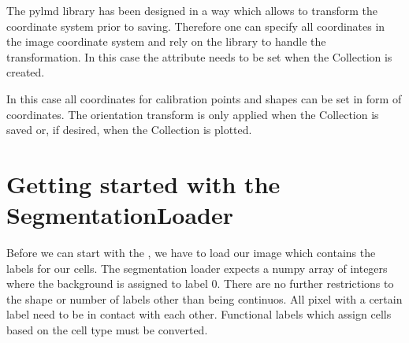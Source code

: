 \documentclass[a4paper,10pt,english,openany,oneside]{sphinxmanual}
\begin{document}
\noindent{}

\sphinxAtStartPar
The py\sphinxhyphen{}lmd library has been designed in a way which allows to transform the coordinate system prior to saving. Therefore one can specify all coordinates in the image coordinate system and rely on the library to handle the transformation. In this case the  attribute needs to be set when the Collection is created.

\begin{sphinxVerbatim}[commandchars=\\\{\}]
  \PYG{p}{[}\PYG{p}{[} \PYG{p}{]} \PYG{p}{[} \PYG{p}{]} \PYG{p}{[} \PYG{p}{]}\PYG{p}{]}

    
  \PYG{p}{[}\PYG{p}{[} \PYG{p}{]} \PYG{p}{[} \PYG{p}{]}\PYG{p}{]}
\end{sphinxVerbatim}

\sphinxAtStartPar
In this case  all coordinates for calibration points and shapes can be set in form of  coordinates. The orientation transform is only applied when the Collection is saved or, if desired, when the Collection is plotted.


\section{Getting started with the SegmentationLoader}
\label{\detokenize{pages/segmentation_loader:getting-started-with-the-segmentationloader}}
\sphinxAtStartPar
Before we can start with the , we have to load our image which contains the labels for our cells. The segmentation loader expects a numpy array of integers where the background is assigned to label 0. There are no further restrictions to the shape or number of labels other than being continuos. All pixel with a certain label need to be in contact with each other. Functional labels which assign cells based on the cell type must be converted.
\end{document}

